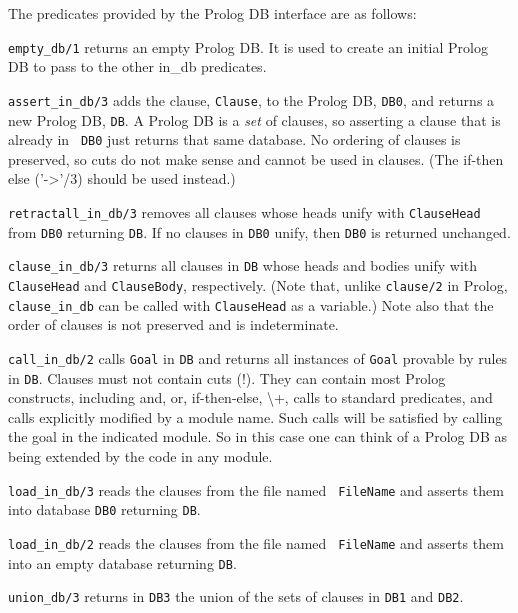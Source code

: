 The predicates provided by the Prolog DB interface are as follows:
\begin{description}
{\tt empty\_db/1} returns an empty Prolog DB.  It is used to create an
initial Prolog DB to pass to the other in\_db predicates.

{\tt assert\_in\_db/3} adds the clause, {\tt Clause}, to the Prolog
DB, {\tt DB0}, and returns a new Prolog DB, {\tt DB}.  A Prolog DB is
a {\em set} of clauses, so asserting a clause that is already in {\tt
DB0} just returns that same database.  No ordering of clauses is
preserved, so cuts do not make sense and cannot be used in clauses.
(The if-then else ('->'/3) should be used instead.)

{\tt retractall\_in\_db/3} removes all clauses whose heads unify with
{\tt ClauseHead} from {\tt DB0} returning {\tt DB}.  If no clauses in
{\tt DB0} unify, then {\tt DB0} is returned unchanged.

{\tt clause\_in\_db/3} returns all clauses in {\tt DB} whose heads and
bodies unify with {\tt ClauseHead} and {\tt ClauseBody}, respectively.
(Note that, unlike {\tt clause/2} in Prolog, {\tt clause\_in\_db} can
be called with {\tt ClauseHead} as a variable.)  Note also that the
order of clauses is not preserved and is indeterminate.

{\tt call\_in\_db/2} calls {\tt Goal} in {\tt DB} and returns all
instances of {\tt Goal} provable by rules in {\tt DB}.  Clauses must
not contain cuts (!).  They can contain most Prolog constructs,
including and, or, if-then-else, \textbackslash+, calls to standard predicates, and
calls explicitly modified by a module name. Such calls will be
satisfied by calling the goal in the indicated module. So in this case
one can think of a Prolog DB as being extended by the code in any
module.

{\tt load\_in\_db/3} reads the clauses from the file named {\tt
FileName} and asserts them into database {\tt DB0} returning {\tt DB}.

{\tt load\_in\_db/2} reads the clauses from the file named {\tt
FileName} and asserts them into an empty database returning {\tt DB}.

{\tt union\_db/3} returns in {\tt DB3} the union of the sets of
clauses in {\tt DB1} and {\tt DB2}.

\end{description}



